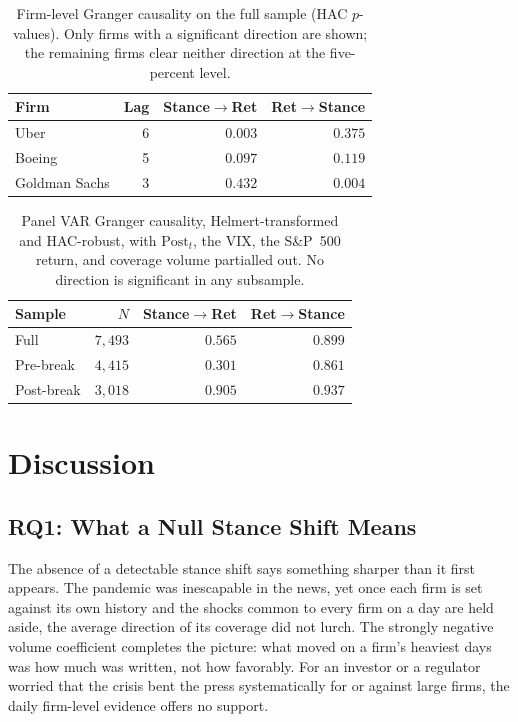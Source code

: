 \documentclass[conference]{IEEEtran}
\begin{document}
\begin{table}[!t]
\caption{Firm-level Granger causality on the full sample (HAC $p$-values). Only firms
with a significant direction are shown; the remaining firms clear neither direction at
the five-percent level.}
\label{tab:granger}
\centering
\small
\begin{tabular}{lrrr}
\toprule
Firm & Lag & Stance$\to$Ret & Ret$\to$Stance \\
\midrule
Uber          & 6 & $\mathbf{0.003}$ & $0.375$ \\
Boeing        & 5 & $0.097$          & $0.119$ \\
Goldman Sachs & 3 & $0.432$          & $\mathbf{0.004}$ \\
\bottomrule
\end{tabular}
\end{table}

\begin{table}[!t]
\caption{Panel VAR Granger causality, Helmert-transformed and HAC-robust, with
$\text{Post}_t$, the VIX, the S\&P~500 return, and coverage volume partialled out.
No direction is significant in any subsample.}
\label{tab:panelvar}
\centering
\small
\begin{tabular}{lrrr}
\toprule
Sample & $N$ & Stance$\to$Ret & Ret$\to$Stance \\
\midrule
Full       & $7{,}493$ & $0.565$ & $0.899$ \\
Pre-break  & $4{,}415$ & $0.301$ & $0.861$ \\
Post-break & $3{,}018$ & $0.905$ & $0.937$ \\
\bottomrule
\end{tabular}
\end{table}

\section{Discussion}

\subsection{RQ1: What a Null Stance Shift Means}
The absence of a detectable stance shift says something sharper than it first
appears. The pandemic was inescapable in the news, yet once each firm is set against
its own history and the shocks common to every firm on a day are held aside, the
average direction of its coverage did not lurch. The strongly negative volume
coefficient completes the picture: what moved on a firm's heaviest days was how much
was written, not how favorably. For an investor or a regulator worried that the
crisis bent the press systematically for or against large firms, the daily
firm-level evidence offers no support.
\end{document}

